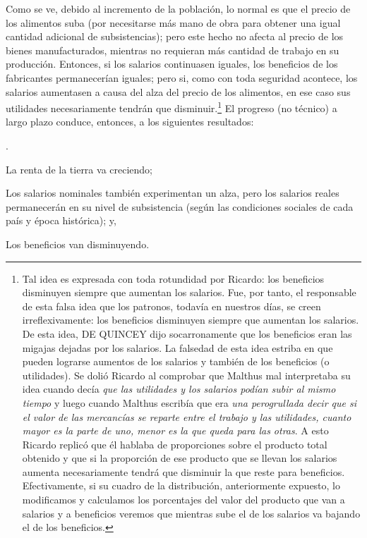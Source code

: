 \documentclass[10pt,a4paper]{article}
\newcounter{numitem}
\newenvironment{lnum}
      {\begin{list}{\arabic{numitem}.}{%
          \usecounter{numitem}%
          \setlength{\leftmargin}{1cm}%
          \setlength{\parskip}{3pt}%
          \setlength{\itemsep}{0pt}%
          \setlength{\parsep}{0pt}%
      }}
      {\end{list}}
\begin{document}
Como se ve, debido al incremento de la población, lo normal es que el precio de los alimentos suba (por necesitarse más mano de obra para obtener una igual cantidad adicional de subsistencias); pero este hecho no afecta al precio de los bienes manufacturados, mientras no requieran más cantidad de trabajo en su producción. Entonces, si los salarios continuasen iguales, los beneficios de los fabricantes permanecerían iguales; pero si, como con toda seguridad acontece, los salarios aumentasen a causa del alza del precio de los alimentos, en ese caso sus utilidades necesariamente tendrán que disminuir.\footnote{%
    Tal idea es expresada con toda rotundidad por Ricardo: los beneficios disminuyen siempre que aumentan los salarios. Fue, por tanto, el responsable de esta falsa idea que los patronos, todavía en nuestros días, se creen irreflexivamente: los beneficios disminuyen siempre que aumentan los salarios. De esta idea, DE QUINCEY dijo socarronamente que los beneficios eran las migajas dejadas por los salarios. La falsedad de esta idea estriba en que pueden lograrse aumentos de los salarios y también de los beneficios (o utilidades). Se dolió Ricardo al comprobar que Malthus mal interpretaba su idea cuando decía \textit{que las utilidades y los salarios podían subir al mismo tiempo} y luego cuando Malthus escribía que era \textit{una perogrullada decir que si el valor de las mercancías se reparte entre el trabajo y las utilidades, cuanto mayor es la parte de uno, menor es la que queda para las otras}. A esto Ricardo replicó que él hablaba de proporciones sobre el producto total obtenido y que si la proporción de ese producto que se llevan los salarios aumenta necesariamente tendrá que disminuir la que reste para beneficios.\\
Efectivamente, si su cuadro de la distribución, anteriormente expuesto, lo modificamos y calculamos los porcentajes del valor del producto que van a salarios y a beneficios veremos que mientras sube el de los salarios va bajando el de los beneficios.
} El progreso (no técnico) a largo plazo conduce, entonces, a los siguientes resultados:
\begin{lnum}
    \item La renta de la tierra va creciendo;
    \item Los salarios nominales también experimentan un alza, pero los salarios reales permanecerán en su nivel de subsistencia (según las condiciones sociales de cada país y época histórica); y,
    \item Los beneficios van disminuyendo.
\end{lnum}
\end{document}
